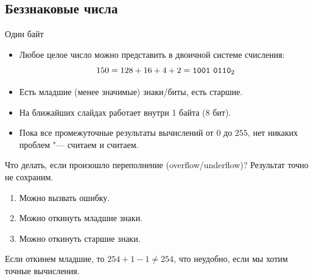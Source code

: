 \subsection{Беззнаковые числа}

\begin{frame}
\end{frame}

\begin{frame}[t]{Один байт}
	\begin{itemize}
		\item
			Любое целое число можно представить в двоичной системе счисления:
			\[ 150 = 128 + 16 + 4 + 2 = \t{1001~0110}_2 \]
		\item
			Есть младшие (менее значимые) знаки/биты, есть старшие.
		\item
			На ближайших слайдах работает внутри 1 байта (8 бит).
		\item
			Пока все промежуточные результаты вычислений от $0$ до $255$, нет никаких проблем "--- считаем и считаем.
	\end{itemize}
	Что делать, если произошло переполнение (overflow/underflow)?
	Результат точно не сохраним.
	\begin{enumerate}
		\item Можно вызвать ошибку.
		\item Можно откинуть младшие знаки.
		\item Можно откинуть старшие знаки.
	\end{enumerate}
	Если откинем младшие, то $254+1-1\neq 254$, что неудобно, если мы хотим точные вычисления.
\end{frame}

